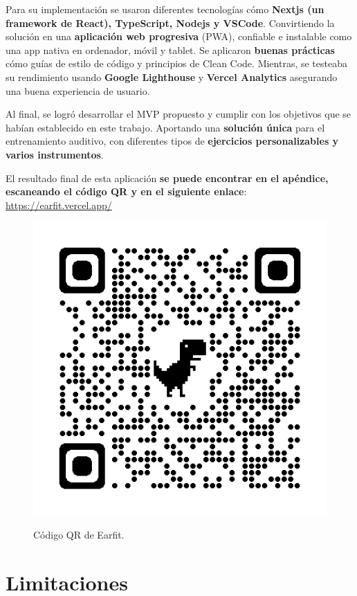 \documentclass[12pt,twoside,titlepage]{report}
\begin{document}
{Para su implementación se usaron diferentes tecnologías cómo \textbf{Nextjs (un framework de React), TypeScript, Nodejs y VSCode}. Convirtiendo la solución en una \textbf{aplicación web progresiva} (PWA), confiable e instalable como una app nativa en ordenador, móvil y tablet. Se aplicaron \textbf{buenas prácticas} cómo guías de estilo de código y principios de Clean Code. Mientras, se testeaba su rendimiento usando \textbf{Google Lighthouse} y \textbf{Vercel Analytics} asegurando una buena experiencia de usuario.

Al final, se logró desarrollar el MVP propuesto y cumplir con los objetivos que se habían establecido en este trabajo. Aportando una \textbf{solución única} para el entrenamiento auditivo, con diferentes tipos de \textbf{ejercicios personalizables y varios instrumentos}. 

El resultado final de esta aplicación \textbf{se puede encontrar en el apéndice, escaneando el código QR y en el siguiente enlace}: \url{https://earfit.vercel.app/}

\begin{figure}[H]
    \centering
    \includegraphics[scale=0.25]{Conclusiones/EarfitQR}
    \label{fig:EarfitQR}
    \caption{Código QR de Earfit.}
\end{figure}

\section{Limitaciones}

}
\end{document}
